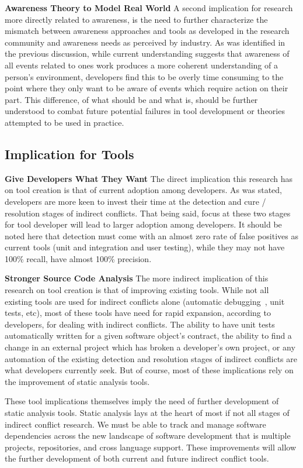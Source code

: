 \documentclass[conference]{IEEEtran}
\begin{document}
\textbf{Awareness Theory to Model Real World}
A second implication for research more directly related to awareness, is the need to further characterize the
mismatch between awareness approaches and tools as developed in the research community and awareness needs as perceived
by industry.
As was identified in the previous discussion, while current understanding suggests that awareness of all events related to ones work
produces a more coherent understanding of a person's environment, developers find this to be overly time consuming
to the point where they only want to be aware of events which require action on their part. This difference, of what 
should be and what is, should be further understood to combat future potential failures in
tool development or theories attempted to be used in practice.

\subsection{Implication for Tools}
\label{sec:implt}

\textbf{Give Developers What They Want}
The direct implication this research has on tool creation is that of current adoption among developers. As was stated,
developers are more keen to invest their time at the detection and cure / resolution stages of indirect conflicts. That being 
said, focus at these two stages for tool developer will lead to larger adoption among developers.
It should be noted here that detection must come with an almost zero rate of false positives as
current tools (unit and integration and user testing), while they may not have 100\% recall, have almost 100\% precision.

\textbf{Stronger Source Code Analysis}
The more indirect implication of this research on tool creation is that of improving existing tools. While not all existing
tools are used for indirect conflicts alone (automatic debugging~\cite{Zeller:2005:WPF}, unit tests, etc), most of these tools
have need for rapid expansion, according to developers, for dealing with indirect conflicts. The ability to have unit tests
automatically written for a given software object's contract, the ability to find a change  in an external project
which has broken a developer's own project, or any automation of the existing detection and resolution stages of indirect
conflicts are what developers currently seek. But of course, most of these implications rely on the improvement of 
static analysis tools.

These tool implications themselves imply the need of further development of static analysis tools. Static 
analysis lays at the heart of most if not all stages of indirect conflict research. We must be able to track and manage
software dependencies across the new landscape of software development that is multiple projects, repositories, and cross
language support. These improvements will allow the further development of both current and future indirect conflict
tools.
\end{document}
